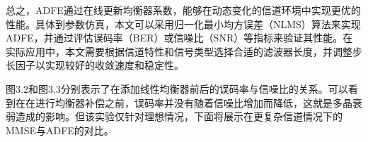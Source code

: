 \documentclass[UTF8,a4paper,12pt]{ctexart}
\numberwithin{equation}{section}
\begin{document}
	总之，ADFE通过在线更新均衡器系数，能够在动态变化的信道环境中实现更优的性能。具体到参数仿真，本文可以采用归一化最小均方误差（NLMS）算法来实现ADFE，并通过评估误码率（BER）或信噪比（SNR）等指标来验证其性能。在实际应用中，本文需要根据信道特性和信号类型选择合适的滤波器长度，并调整步长因子以实现较好的收敛速度和稳定性。
	\begin{figure}[htb] 
	\end{figure}
	\begin{figure}[htb] 
	\end{figure}
	图3.2和图3.3分别表示了在添加线性均衡器前后的误码率与信噪比的关系。可以看到在在进行均衡器补偿之前，误码率并没有随着信噪比增加而降低，这就是多晶衰弱造成的影响。但该实验仅针对理想情况，下面将展示在更复杂信道情况下的MMSE与ADFE的对比。
\end{document}
